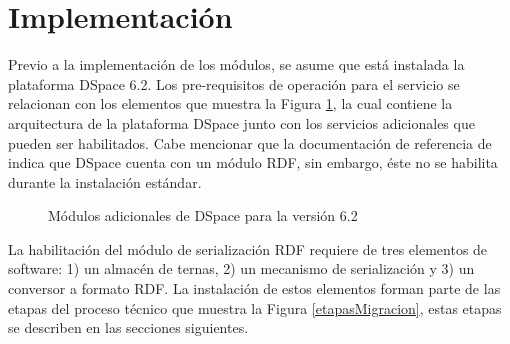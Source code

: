 \section{Implementaci\'on}

Previo a la implementaci\'on de los m\'odulos, se asume que est\'a instalada la plataforma DSpace 6.2. Los pre-requisitos de operaci\'on para el servicio se relacionan con los elementos que muestra la Figura \ref{adicionalesDspace}, la cual contiene la arquitectura de la plataforma DSpace junto con los servicios adicionales que pueden ser habilitados. Cabe mencionar que la documentaci\'on de referencia de \cite{DSpaceRef} indica que DSpace cuenta con un m\'odulo RDF, sin embargo, \'este no se habilita durante la instalaci\'on est\'andar.

\begin{figure}[!ht]
	\centering
    \caption{M\'odulos adicionales de DSpace para la versi\'on 6.2} %
    \label{adicionalesDspace}
\end{figure}

La habilitaci\'on del m\'odulo de serializaci\'on RDF requiere de tres elementos de software: 1) un almac\'en de ternas, 2) un mecanismo de serializaci\'on y 3) un conversor a formato RDF. La instalaci\'on de estos elementos forman parte de las etapas del proceso t\'ecnico que muestra la Figura \ref{etapasMigracion}, estas etapas se describen en las secciones siguientes.

